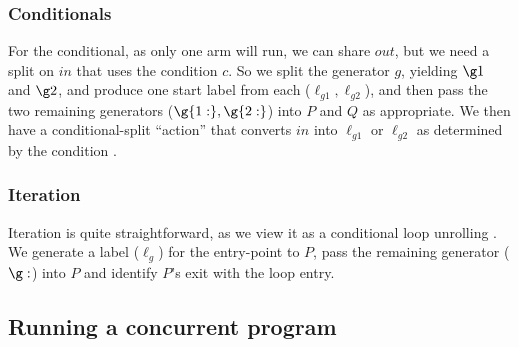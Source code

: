 \subsubsection{Conditionals}

For the conditional, as only one arm will run, we can share $out$,
but we need a split on $in$ that uses the condition $c$.
So we split the generator $g$, yielding $\g1$ and $\g2$, and produce one start label from each
($\ell_{g1},\ell_{g2}$), and then pass the two remaining generators
($\g{1:},\g{2:}$)
into $P$ and $Q$ as appropriate.
We then have a conditional-split ``action'' that
converts $in$ into $\ell_{g1}$ or $\ell_{g2}$ as determined by the condition%
.

\subsubsection{Iteration}


Iteration is quite straightforward,
as we view it as a conditional loop unrolling%
.
We generate a label ($\ell_g$) for the entry-point to $P$,
pass the remaining generator ($\g:$) into $P$
and identify $P$'s exit with the loop entry.

\subsection{Running a concurrent program}

